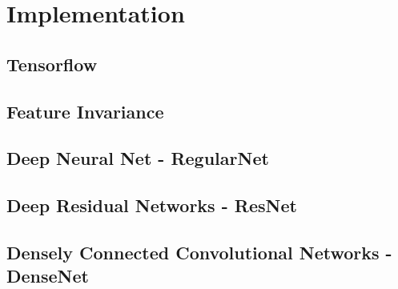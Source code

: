\chapter{Implementation}
\label{chp:impl}

\section{Tensorflow}
\section{Feature Invariance}
\section{Deep Neural Net - RegularNet}
\section{Deep Residual Networks - ResNet}
\section{Densely Connected Convolutional Networks - DenseNet}